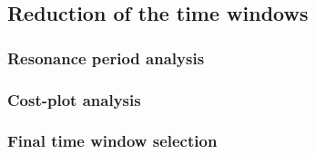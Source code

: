 \subsection{Reduction of the time windows}
\label{subsec:time_red}

\subsubsection{Resonance period analysis}
\label{subsubsec:res_period}

\subsubsection{Cost-plot analysis}
\label{subsubsec:cost_plot_analysis}

\subsubsection{Final time window selection}
\label{subsubsec:final_window}